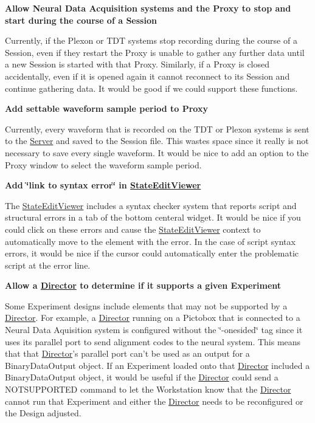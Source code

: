 {\bfseries Allow Neural Data Acquisition systems and the Proxy to stop and start during the course of a Session}\par
 Currently, if the Plexon or T\-D\-T systems stop recording during the course of a Session, even if they restart the Proxy is unable to gather any further data until a new Session is started with that Proxy. Similarly, if a Proxy is closed accidentally, even if it is opened again it cannot reconnect to its Session and continue gathering data. It would be good if we could support these functions.

{\bfseries Add settable waveform sample period to Proxy}\par
 Currently, every waveform that is recorded on the T\-D\-T or Plexon systems is sent to the \hyperlink{class_server}{Server} and saved to the Session file. This wastes space since it really is not necessary to save every single waveform. It would be nice to add an option to the Proxy window to select the waveform sample period.

{\bfseries Add \char`\"{}link to syntax error\char`\"{} in \hyperlink{class_state_edit_viewer}{State\-Edit\-Viewer}}\par
 The \hyperlink{class_state_edit_viewer}{State\-Edit\-Viewer} includes a syntax checker system that reports script and structural errors in a tab of the bottom centeral widget. It would be nice if you could click on these errors and cause the \hyperlink{class_state_edit_viewer}{State\-Edit\-Viewer} context to automatically move to the element with the error. In the case of script syntax errors, it would be nice if the cursor could automatically enter the problematic script at the error line.

{\bfseries Allow a \hyperlink{class_director}{Director} to determine if it supports a given Experiment}\par
 Some Experiment designs include elements that may not be supported by a \hyperlink{class_director}{Director}. For example, a \hyperlink{class_director}{Director} running on a Pictobox that is connected to a Neural Data Aquisition system is configured without the \char`\"{}-\/onesided\char`\"{} tag since it uses its parallel port to send alignment codes to the neural system. This means that that \hyperlink{class_director}{Director}'s parallel port can't be used as an output for a Binary\-Data\-Output object. If an Experiment loaded onto that \hyperlink{class_director}{Director} included a Binary\-Data\-Output object, it would be useful if the \hyperlink{class_director}{Director} could send a N\-O\-T\-S\-U\-P\-P\-O\-R\-T\-E\-D command to let the Workstation know that the \hyperlink{class_director}{Director} cannot run that Experiment and either the \hyperlink{class_director}{Director} needs to be reconfigured or the Design adjusted.

